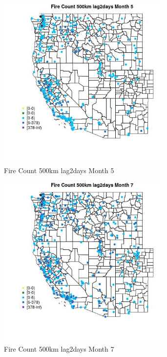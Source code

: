\begin{figure} 
\centering  
\includegraphics[width=0.77\textwidth]{Code_Outputs/Report_ML_input_PM25_Step4_part_e_de_duplicated_aves_compiled_2019-05-18wNAs_MapObsMo5Fire_Count_500km_lag2days.jpg} 
\caption{\label{fig:Report_ML_input_PM25_Step4_part_e_de_duplicated_aves_compiled_2019-05-18wNAsMapObsMo5Fire_Count_500km_lag2days}Fire Count 500km lag2days Month 5} 
\end{figure} 
 

\begin{figure} 
\centering  
\includegraphics[width=0.77\textwidth]{Code_Outputs/Report_ML_input_PM25_Step4_part_e_de_duplicated_aves_compiled_2019-05-18wNAs_MapObsMo7Fire_Count_500km_lag2days.jpg} 
\caption{\label{fig:Report_ML_input_PM25_Step4_part_e_de_duplicated_aves_compiled_2019-05-18wNAsMapObsMo7Fire_Count_500km_lag2days}Fire Count 500km lag2days Month 7} 
\end{figure} 
 

